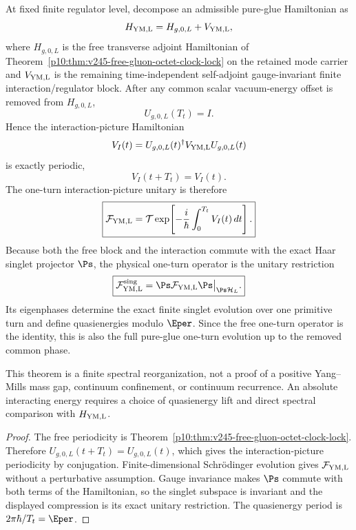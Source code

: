 \documentclass[12pt,a4paper]{article}
\begin{document}
\begin{theorem}
\label{p10:thm:v247-singlet-floquet-qcd}
At fixed finite regulator level, decompose an admissible pure-glue Hamiltonian
as
\[
 H_{\rm YM,L}=H_{g,0,L}+V_{\rm YM,L},
\]
where \(H_{g,0,L}\) is the free transverse adjoint Hamiltonian of
Theorem~\ref{p10:thm:v245-free-gluon-octet-clock-lock} on the retained mode
carrier and \(V_{\rm YM,L}\) is the remaining time-independent self-adjoint
gauge-invariant finite interaction/regulator block.  After any common scalar
vacuum-energy offset is removed from \(H_{g,0,L}\),
\[
 U_{g,0,L}(T_t)=I.
\]
Hence the interaction-picture Hamiltonian
\[
 V_I(t)=U_{g,0,L}(t)^\dagger V_{\rm YM,L}U_{g,0,L}(t)
\]
is exactly periodic,
\[
 \boxed{V_I(t+T_t)=V_I(t).}
\]
The one-turn interaction-picture unitary is therefore
\[
 \boxed{\mathcal F_{\rm YM,L}
 =\mathcal T\exp\!\left[-\frac{i}{\hbar}
 \int_0^{T_t}V_I(t)\,dt\right].}
\]
Because both the free block and the interaction commute with the exact Haar
singlet projector \(\Ps\), the physical one-turn operator is the unitary
restriction
\[
 \boxed{\mathcal F_{\rm YM,L}^{\rm sing}
 =\Ps\mathcal F_{\rm YM,L}\Ps
 \big|_{\Ps\mathcal H_L}.}
\]
Its eigenphases determine the exact finite singlet evolution over one
primitive turn and define quasienergies modulo \(\Eper\).  Since the free
one-turn operator is the identity, this is also the full pure-glue one-turn
evolution up to the removed common phase.

This theorem is a finite spectral reorganization, not a proof of a positive
Yang--Mills mass gap, continuum confinement, or continuum recurrence.  An
absolute interacting energy requires a choice of quasienergy lift and direct
spectral comparison with \(H_{\rm YM,L}\).
\end{theorem}

\begin{proof}
The free periodicity is Theorem~\ref{p10:thm:v245-free-gluon-octet-clock-lock}.
Therefore
\(U_{g,0,L}(t+T_t)=U_{g,0,L}(t)\), which gives the interaction-picture
periodicity by conjugation.  Finite-dimensional Schr\"odinger evolution gives
\(\mathcal F_{\rm YM,L}\) without a perturbative assumption.  Gauge
invariance makes \(\Ps\) commute with both terms of the Hamiltonian, so the
singlet subspace is invariant and the displayed compression is its exact
unitary restriction.  The quasienergy period is
\(2\pi\hbar/T_t=\Eper\).
\end{proof}
\end{document}
